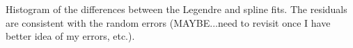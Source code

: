 Histogram of the differences between the Legendre and spline fits.  The residuals are consistent with the random errors (MAYBE...need to revisit once I have better idea of my errors, etc.). \label{resid_fits}